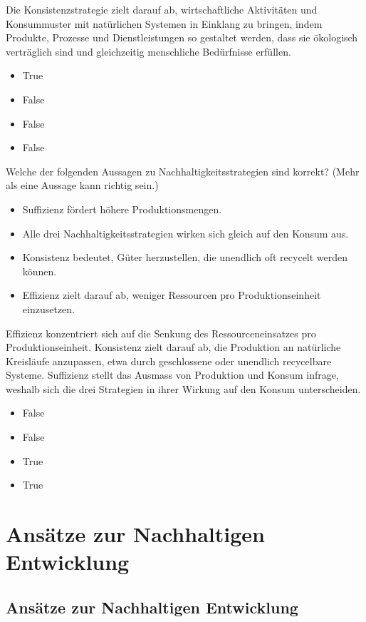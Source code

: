 \documentclass[
  nswissgerman,
  a4paper,
  DIV=11,
  numbers=noendperiod,
  oneside,
  openany]{scrreprt}
\providecommand{\tightlist}{%
  \setlength{\itemsep}{0pt}\setlength{\parskip}{0pt}}
\begin{document}
Die Konsistenzstrategie zielt darauf ab, wirtschaftliche Aktivitäten und
Konsummuster mit natürlichen Systemen in Einklang zu bringen, indem
Produkte, Prozesse und Dienstleistungen so gestaltet werden, dass sie
ökologisch verträglich sind und gleichzeitig menschliche Bedürfnisse
erfüllen.

\begin{itemize}
\tightlist
\item
  True
\item
  False
\item
  False
\item
  False
\end{itemize}

Welche der folgenden Aussagen zu Nachhaltigkeitsstrategien sind korrekt?
(Mehr als eine Aussage kann richtig sein.)

\begin{itemize}
\tightlist
\item[$\square$]
  Suffizienz fördert höhere Produktionsmengen.
\item[$\square$]
  Alle drei Nachhaltigkeitsstrategien wirken sich gleich auf den Konsum
  aus.
\item[$\square$]
  Konsistenz bedeutet, Güter herzustellen, die unendlich oft recycelt
  werden können.
\item[$\square$]
  Effizienz zielt darauf ab, weniger Ressourcen pro Produktionseinheit
  einzusetzen.
\end{itemize}

Effizienz konzentriert sich auf die Senkung des Ressourceneinsatzes pro
Produktionseinheit. Konsistenz zielt darauf ab, die Produktion an
natürliche Kreisläufe anzupassen, etwa durch geschlossene oder unendlich
recycelbare Systeme. Suffizienz stellt das Ausmass von Produktion und
Konsum infrage, weshalb sich die drei Strategien in ihrer Wirkung auf
den Konsum unterscheiden.

\begin{itemize}
\tightlist
\item
  False
\item
  False
\item
  True
\item
  True
\end{itemize}

\part{Ansätze zur Nachhaltigen Entwicklung}

\chapter{Ansätze zur Nachhaltigen
Entwicklung}\label{ansuxe4tze-zur-nachhaltigen-entwicklung-1}
\end{document}

